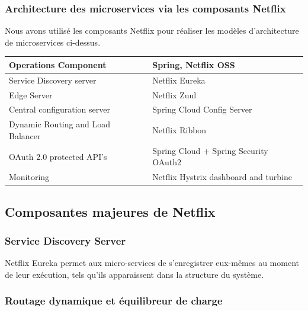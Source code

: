 \subsubsection{Architecture des microservices via les composants Netflix}
Nous avons utilisé les composants Netflix pour réaliser les modèles d’architecture de microservices ci-dessus.

\begin{table}[H]
	\begin{tabular}{|l|l|}
		\hline
		\rowcolor[HTML]{5174DA} 
		{\color[HTML]{FFFFFF} \textbf{Operations Component}} & {\color[HTML]{FFFFFF} \textbf{Spring, Netflix OSS}} \\ \hline
		Service Discovery server & Netflix Eureka \\ \hline
		Edge Server & Netflix Zuul \\ \hline
		Central configuration server & Spring Cloud Config Server \\ \hline
		Dynamic Routing and Load Balancer & Netflix Ribbon \\ \hline
		OAuth 2.0 protected API’s & Spring Cloud + Spring Security OAuth2 \\ \hline
		Monitoring & Netflix Hystrix dashboard and turbine \\ \hline
	\end{tabular}
\end{table}

\subsection{Composantes majeures de Netflix}



\subsubsection{Service Discovery Server} 

 Netflix Eureka permet aux micro-services de s’enregistrer eux-mêmes au moment de leur exécution, tels qu’ils apparaissent dans la structure du système.



\subsubsection{Routage dynamique et équilibreur de charge} 

